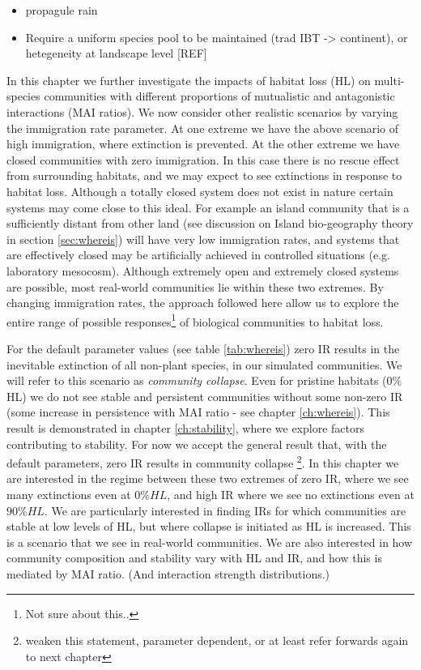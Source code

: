 \begin{itemize}
	\item propagule rain
	\item Require a uniform species pool to be maintained (trad IBT -> continent), or hetegeneity at landscape level [REF]
\end{itemize}

In this chapter we further investigate the impacts of habitat loss (HL)  on multi-species communities with different proportions of mutualistic and antagonistic interactions (MAI ratios). We now consider other realistic scenarios by varying the immigration rate parameter. At one extreme we have the above scenario of high immigration, where extinction is prevented. At the other extreme we have closed communities with zero immigration. In this case there is no rescue effect from surrounding habitats, and we may expect to see extinctions in response to habitat loss. Although a totally closed system does not exist in nature certain systems may come close to this ideal. For example an island community that is a sufficiently distant from other land (see discussion on Island bio-geography theory in section \ref{sec:whereis}) will have very low immigration rates, and systems that are effectively closed may be artificially achieved in controlled situations (e.g. laboratory mesocosm). Although extremely open and extremely closed systems are possible, most real-world communities lie within these two extremes. By changing immigration rates, the approach followed here allow us to explore the entire range of possible responses\footnote{Not sure about this..} of biological communities to habitat loss.

For the default parameter values (see table \ref{tab:whereis}) zero IR results in the inevitable extinction of all non-plant species, in our simulated communities. We will refer to this scenario as \emph{community collapse}. Even for pristine habitats ($0\%$ HL) we do not see stable and persistent communities without some non-zero IR (some increase in persistence with MAI ratio - see chapter \ref{ch:whereis}). This result is demonstrated in chapter \ref{ch:stability}, where we explore factors contributing to stability. For now we accept the general result that, with the default parameters, zero IR results in community collapse \footnote{weaken this statement, parameter dependent, or at least refer forwards again to next chapter}. In this chapter we are interested in the regime between these two extremes of zero IR, where we see many extinctions even at $0\% HL$, and high IR where we see no extinctions even at $90\% HL$. We are particularly interested in finding IRs for which communities are stable at low levels of HL, but where collapse is initiated as HL is increased. This is a scenario that we see in real-world communities. We are also interested in how community composition and stability vary with HL and IR, and how this is mediated by MAI ratio. (And interaction strength distributions.)

